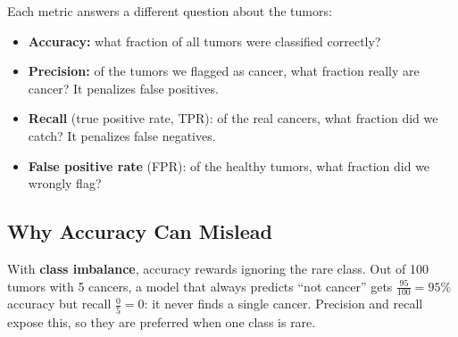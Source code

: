 \begin{keeptogether}
Each metric answers a different question about the tumors:
\begin{itemize}
  \item \textbf{Accuracy:} what fraction of all tumors were classified correctly?
  \item \textbf{Precision:} of the tumors we flagged as cancer, what fraction really are cancer? It penalizes false positives.
  \item \textbf{Recall} (true positive rate, TPR): of the real cancers, what fraction did we catch? It penalizes false negatives.
  \item \textbf{False positive rate} (FPR): of the healthy tumors, what fraction did we wrongly flag?
\end{itemize}
\end{keeptogether}

\subsection*{Why Accuracy Can Mislead}
With \textbf{class imbalance}, accuracy rewards ignoring the rare class. Out of 100 tumors with 5 cancers, a model that always predicts ``not cancer'' gets $\tfrac{95}{100} = 95\%$ accuracy but recall $\tfrac{0}{5} = 0$: it never finds a single cancer. Precision and recall expose this, so they are preferred when one class is rare.

